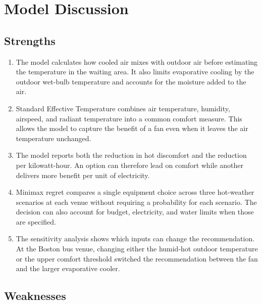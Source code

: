 \section{Model Discussion}

\subsection{Strengths}

\begin{enumerate}
    \item
    The model calculates how cooled air mixes with outdoor air before estimating the temperature in the waiting area. It also limits evaporative cooling by the outdoor wet-bulb temperature and accounts for the moisture added to the air.

    \item
    Standard Effective Temperature combines air temperature, humidity, airspeed, and radiant temperature into a common comfort measure. This allows the model to capture the benefit of a fan even when it leaves the air temperature unchanged.

    \item
    The model reports both the reduction in hot discomfort and the reduction per kilowatt-hour. An option can therefore lead on comfort while another delivers more benefit per unit of electricity.

    \item
    Minimax regret compares a single equipment choice across three hot-weather scenarios at each venue without requiring a probability for each scenario. The decision can also account for budget, electricity, and water limits when those are specified.

    \item
    The sensitivity analysis shows which inputs can change the recommendation. At the Boston bus venue, changing either the humid-hot outdoor temperature or the upper comfort threshold switched the recommendation between the fan and the larger evaporative cooler.
\end{enumerate}

\subsection{Weaknesses}

